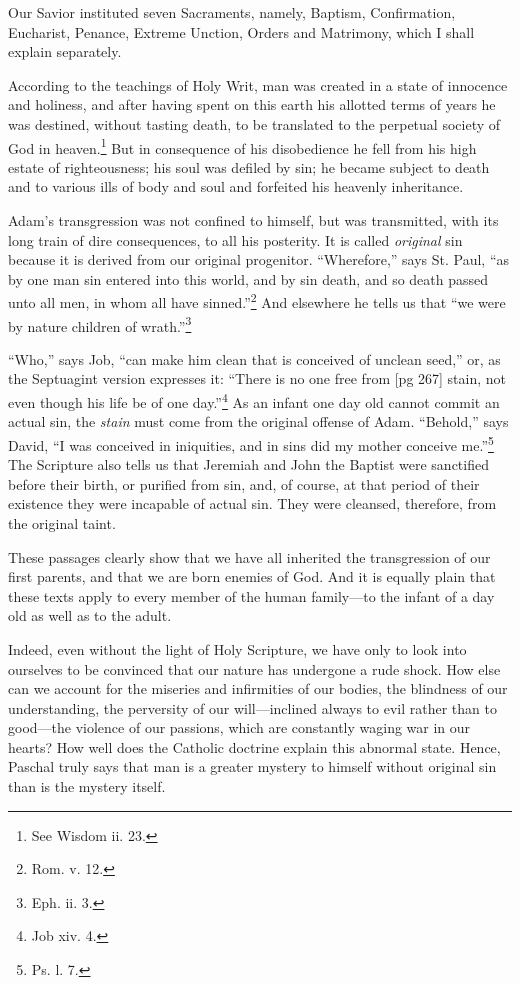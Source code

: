 Our Savior instituted seven Sacraments, namely,
Baptism, Confirmation, Eucharist, Penance,
Extreme Unction, Orders and Matrimony, which
I shall explain separately.

According to the teachings of Holy Writ, man
was created in a state of innocence and holiness,
and after having spent on this earth his allotted
terms of years he was destined, without tasting
death, to be translated to the perpetual society
of God in heaven.\footnote{See Wisdom ii.
23.} But in consequence of his disobedience
he fell from his high estate of righteousness;
his soul was defiled by sin; he became
subject to death and to various ills of body and
soul and forfeited his heavenly inheritance.

Adam's transgression was not confined to himself,
but was transmitted, with its long train of
dire consequences, to all his posterity. It is called
\emph{original} sin because it is derived from our original
progenitor. “Wherefore,” says St. Paul, “as by
one man sin entered into this world, and by sin
death, and so death passed unto all men, in whom
all have sinned.”\footnote{Rom. v.
12.} And elsewhere he tells us
that “we were by nature children of wrath.”\footnote{Eph. ii. 3.}

“Who,” says Job, “can make him clean that is
conceived of unclean seed,” or, as the Septuagint
version expresses it: “There is no one free from
[pg 267]
stain, not even though his life be of one day.”\footnote{Job xiv. 4.}
As an infant one day old cannot commit an actual
sin, the \emph{stain} must come from the original offense
of Adam. “Behold,” says David, “I was conceived
in iniquities, and in sins did my mother
conceive me.”\footnote{Ps. l.
7.} The Scripture also tells us that
Jeremiah and John the Baptist were sanctified
before their birth, or purified from sin, and, of
course, at that period of their existence they
were incapable of actual sin. They were cleansed,
therefore, from the original taint.

These passages clearly show that we have all
inherited the transgression of our first parents,
and that we are born enemies of God. And it is
equally plain that these texts apply to every member
of the human family—to the infant of a day
old as well as to the adult.

Indeed, even without the light of Holy Scripture,
we have only to look into ourselves to be
convinced that our nature has undergone a rude
shock. How else can we account for the miseries
and infirmities of our bodies, the blindness of our
understanding, the perversity of our will—inclined
always to evil rather than to good—the violence
of our passions, which are constantly waging war
in our hearts? How well does the Catholic doctrine
explain this abnormal state. Hence, Paschal
truly says that man is a greater mystery
to himself without original sin than is the mystery
itself.

